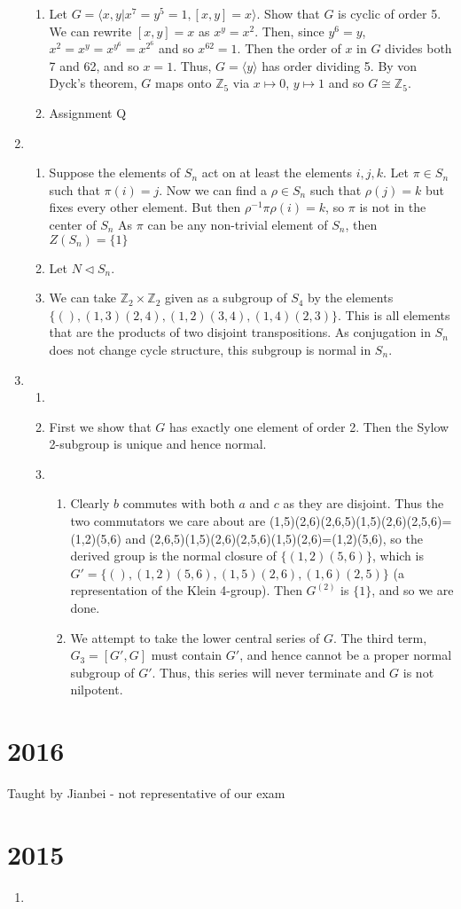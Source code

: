 \documentclass[]{article}
\begin{document}
\begin{enumerate}
\begin{enumerate}
			\item Let $G=\langle x,y|x^7=y^5=1,[x,y]=x\rangle$. Show that $G$ is cyclic of order 5. We can rewrite $[x,y]=x$ as $x^y=x^2$. Then, since $y^6=y$, $x^2=x^y=x^{y^6}=x^{2^6}$ and so $x^62=1$. Then the order of $x$ in $G$ divides both 7 and 62, and so $x=1$. Thus, $G=\langle y\rangle$ has order dividing 5. By von Dyck's theorem, $G$ maps onto $\mathbb{Z}_5$ via $x\mapsto 0$, $y\mapsto 1$ and so $G\cong \mathbb{Z}_5$.
			\item Assignment Q
		\end{enumerate}
		\item %
		\begin{enumerate}
			\item Suppose the elements of $S_n$ act on at least the elements $i,j,k$. Let $\pi\in S_n$ such that $\pi(i)=j$. Now we can find a $\rho\in S_n$ such that $\rho(j)=k$ but fixes every other element. But then $\rho^{-1}\pi\rho(i)=k$, so $\pi$ is not in the center of $S_n$ As $\pi$ can be any non-trivial element of $S_n$, then $Z(S_n)=\{1 \}$
			\item Let $N\vartriangleleft S_n$. 
			\item We can take $\mathbb{Z}_2\times\mathbb{Z}_2$ given as a subgroup of $S_4$ by the elements $\{(), (1,3)(2,4),(1,2)(3,4),(1,4)(2,3) \}$. This is all elements that are the products of two disjoint transpositions. As conjugation in $S_n$ does not change cycle structure, this subgroup is normal in $S_n$.
		\end{enumerate}
		\item \begin{enumerate}
			\item 
			\item First we show that $G$ has exactly one element of order 2. Then the Sylow 2-subgroup is unique and hence normal.
			\item \begin{enumerate}
				\item Clearly $b$ commutes with both $a$ and $c$ as they are disjoint. Thus the two commutators we care about are (1,5)(2,6)(2,6,5)(1,5)(2,6)(2,5,6)=(1,2)(5,6) and (2,6,5)(1,5)(2,6)(2,5,6)(1,5)(2,6)=(1,2)(5,6), so the derived group is the normal closure of $\{(1,2)(5,6)\}$, which is $G'=\{(),(1,2)(5,6),(1,5)(2,6),(1,6)(2,5)\}$ (a representation of the Klein 4-group). Then $G^{(2)}$ is $\{1\}$, and so we are done.
				\item We attempt to take the lower central series of $G$. The third term, $G_3=[G',G]$ must contain $G'$, and hence cannot be a proper normal subgroup of $G'$. Thus, this series will never terminate and $G$ is not nilpotent. 
			\end{enumerate}
		\end{enumerate}
	\end{enumerate}
	\section{2016}
	Taught by Jianbei - not representative of our exam
	\section{2015}
	\begin{enumerate}
		\item 
	\end{enumerate}
\end{document}
